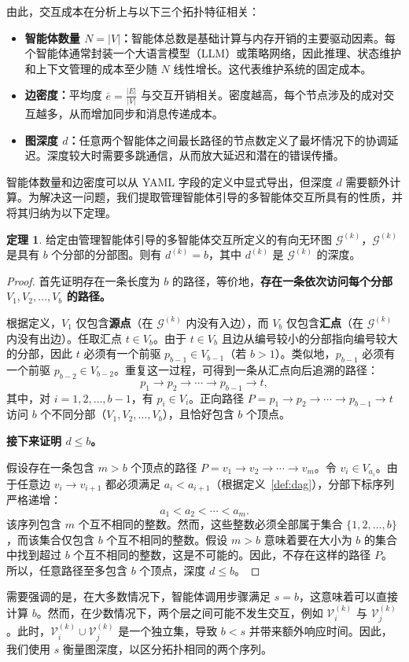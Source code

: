 \documentclass{article}
\theoremstyle{definition}
\newtheorem{theorem}{定理}
\begin{document}
由此，交互成本在分析上与以下三个拓扑特征相关：
\begin{itemize}
\item \textbf{智能体数量 \( N = |V| \)：}智能体总数是基础计算与内存开销的主要驱动因素。每个智能体通常封装一个大语言模型（LLM）或策略网络，因此推理、状态维护和上下文管理的成本至少随 \( N \) 线性增长。这代表维护系统的固定成本。
\item \textbf{边密度：}平均度 \( \bar{e} = \frac{|E|}{|V|} \) 与交互开销相关。密度越高，每个节点涉及的成对交互越多，从而增加同步和消息传递成本。
\item \textbf{图深度 \( d \)：}任意两个智能体之间最长路径的节点数定义了最坏情况下的协调延迟。深度较大时需要多跳通信，从而放大延迟和潜在的错误传播。
\end{itemize}

智能体数量和边密度可以从 YAML 字段的定义中显式导出，但深度 $d$ 需要额外计算。为解决这一问题，我们提取管理智能体引导的多智能体交互所具有的性质，并将其归纳为以下定理。

\begin{theorem}
\label{thm-1}
    给定由管理智能体引导的多智能体交互所定义的有向无环图 $\mathcal{G}^{(k)}$，$\mathcal{G}^{(k)}$ 是具有 $b$ 个分部的分部图。则有 $d^{(k)} = b$，其中 $d^{(k)}$ 是 $\mathcal{G}^{(k)}$ 的深度。
\end{theorem}
\begin{proof}
     首先证明存在一条长度为 $b$ 的路径，等价地，\textbf{存在一条依次访问每个分部 $V_1, V_2, \ldots, V_b$ 的路径。}
    
    根据定义，$V_1$ 仅包含\textbf{源点}（在 $\mathcal{G}^{(k)}$ 内没有入边），而 $V_b$ 仅包含\textbf{汇点}（在 $\mathcal{G}^{(k)}$ 内没有出边）。任取汇点 $t \in V_b$。由于 $t \in V_b$ 且边从编号较小的分部指向编号较大的分部，因此 $t$ 必须有一个前驱 $p_{b-1} \in V_{b-1}$（若 $b>1$）。类似地，$p_{b-1}$ 必须有一个前驱 $p_{b-2} \in V_{b-2}$。重复这一过程，可得到一条从汇点向后追溯的路径：
    \[p_1 \rightarrow p_2 \rightarrow \cdots \rightarrow p_{b-1} \rightarrow t,\]
    其中，对 $i = 1, 2, \ldots, b-1$，有 $p_i \in V_i$。正向路径 $P = p_1 \rightarrow p_2 \rightarrow \cdots \rightarrow p_{b-1} \rightarrow t$ 访问 $b$ 个不同分部（$V_1, V_2, \ldots, V_b$），且恰好包含 $b$ 个顶点。

    \textbf{接下来证明 $d \leq b$。}

    假设存在一条包含 $m > b$ 个顶点的路径 $P = v_1 \rightarrow v_2 \rightarrow \cdots \rightarrow v_m$。令 $v_i \in V_{a_i}$。由于任意边 $v_i \rightarrow v_{i+1}$ 都必须满足 $a_i < a_{i+1}$（根据定义~\ref{def:dag}），分部下标序列严格递增：
    \[a_1 < a_2 < \cdots < a_m.\]
    该序列包含 $m$ 个互不相同的整数。然而，这些整数必须全部属于集合 $\{1, 2, \ldots, b\}$，而该集合仅包含 $b$ 个互不相同的整数。假设 $m > b$ 意味着要在大小为 $b$ 的集合中找到超过 $b$ 个互不相同的整数，这是不可能的。因此，不存在这样的路径 $P$。所以，任意路径至多包含 $b$ 个顶点，深度 $d \leq b$。
\end{proof}
需要强调的是，在大多数情况下，智能体调用步骤满足 $s = b$，这意味着可以直接计算 $b$。然而，在少数情况下，两个层之间可能不发生交互，例如 $\mathcal{V}^{(k)}_i$ 与 $\mathcal{V}^{(k)}_j$。此时，$\mathcal{V}^{(k)}_i \cup \mathcal{V}^{(k)}_j$ 是一个独立集，导致 $b < s$ 并带来额外响应时间。因此，我们使用 $s$ 衡量图深度，以区分拓扑相同的两个序列。
\end{document}
